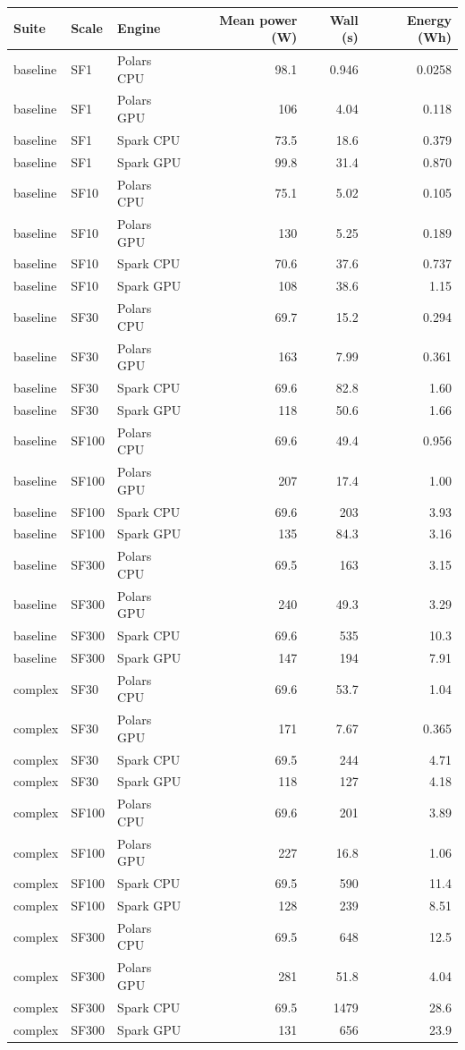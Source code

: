 \begin{longtable}{lllrrr}
\toprule
Suite & Scale & Engine & Mean power (W) & Wall (s) & Energy (Wh) \\
\midrule
\endhead
\bottomrule
\endfoot
baseline & SF1 & Polars CPU & 98.1 & 0.946 & 0.0258 \\
baseline & SF1 & Polars GPU & 106 & 4.04 & 0.118 \\
baseline & SF1 & Spark CPU & 73.5 & 18.6 & 0.379 \\
baseline & SF1 & Spark GPU & 99.8 & 31.4 & 0.870 \\
baseline & SF10 & Polars CPU & 75.1 & 5.02 & 0.105 \\
baseline & SF10 & Polars GPU & 130 & 5.25 & 0.189 \\
baseline & SF10 & Spark CPU & 70.6 & 37.6 & 0.737 \\
baseline & SF10 & Spark GPU & 108 & 38.6 & 1.15 \\
baseline & SF30 & Polars CPU & 69.7 & 15.2 & 0.294 \\
baseline & SF30 & Polars GPU & 163 & 7.99 & 0.361 \\
baseline & SF30 & Spark CPU & 69.6 & 82.8 & 1.60 \\
baseline & SF30 & Spark GPU & 118 & 50.6 & 1.66 \\
baseline & SF100 & Polars CPU & 69.6 & 49.4 & 0.956 \\
baseline & SF100 & Polars GPU & 207 & 17.4 & 1.00 \\
baseline & SF100 & Spark CPU & 69.6 & 203 & 3.93 \\
baseline & SF100 & Spark GPU & 135 & 84.3 & 3.16 \\
baseline & SF300 & Polars CPU & 69.5 & 163 & 3.15 \\
baseline & SF300 & Polars GPU & 240 & 49.3 & 3.29 \\
baseline & SF300 & Spark CPU & 69.6 & 535 & 10.3 \\
baseline & SF300 & Spark GPU & 147 & 194 & 7.91 \\
complex & SF30 & Polars CPU & 69.6 & 53.7 & 1.04 \\
complex & SF30 & Polars GPU & 171 & 7.67 & 0.365 \\
complex & SF30 & Spark CPU & 69.5 & 244 & 4.71 \\
complex & SF30 & Spark GPU & 118 & 127 & 4.18 \\
complex & SF100 & Polars CPU & 69.6 & 201 & 3.89 \\
complex & SF100 & Polars GPU & 227 & 16.8 & 1.06 \\
complex & SF100 & Spark CPU & 69.5 & 590 & 11.4 \\
complex & SF100 & Spark GPU & 128 & 239 & 8.51 \\
complex & SF300 & Polars CPU & 69.5 & 648 & 12.5 \\
complex & SF300 & Polars GPU & 281 & 51.8 & 4.04 \\
complex & SF300 & Spark CPU & 69.5 & 1479 & 28.6 \\
complex & SF300 & Spark GPU & 131 & 656 & 23.9 \\
\end{longtable}
